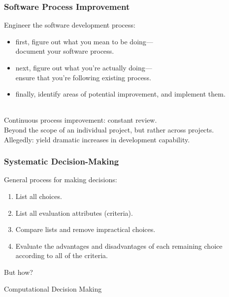 \begin{frame}
\frametitle{Software Process Improvement}

\begin{changemargin}{1cm}
Engineer the software development process:
\begin{itemize}
\item first, figure out what you mean to be doing---\\
document your software process.
\item next, figure out what you're actually doing---\\
ensure that you're following existing process.
\item finally, identify areas of potential improvement, and implement them.
\end{itemize}
~\\

Continuous process improvement: constant review.\\[1em]
Beyond the scope of an individual project, but rather across projects.\\[1em]
Allegedly: yield dramatic increases in development capability.
\end{changemargin}

\end{frame}

\begin{frame}
\frametitle{Systematic Decision-Making}

\begin{changemargin}{2cm}
General process for making decisions:

\begin{enumerate}
\item List all choices.
\item List all evaluation attributes (criteria).
\item Compare lists and remove impractical choices.
\item Evaluate the advantages and disadvantages of each remaining choice
according to all of the criteria.
\end{enumerate}

But how?
\end{changemargin}

\end{frame}

\begin{frame}
	
	
	\vspace{8em}
	
	\begin{block}
	 {\huge Computational Decision Making}
	\end{block}
	
\end{frame}


